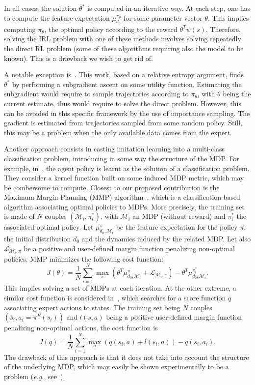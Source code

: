 \documentclass[tablecaption=bottom]{jmlr}
\begin{document}
In all cases, the solution $\theta^*$ is computed in an iterative
way. At each step, one has to compute the feature expectation
$\mu^{\pi_\theta}_{d_0}$ for some parameter vector $\theta$. This
implies computing $\pi_\theta$, the optimal policy according to the
reward $\theta^T\psi(s)$. Therefore, solving the IRL problem with
one of these methods involves solving repeatedly the direct RL
problem (some of these algorithms requiring also the model to be
known). This is a drawback we wish to get rid of.

A notable exception is~\cite{boularias2011relative}. This work,
based on a relative entropy argument, finds $\theta^*$ by performing
a subgradient ascent on some utility function. Estimating the
subgradient would require to sample trajectories according to
$\pi_\theta$, with $\theta$ being the current estimate, thus would
require to solve the direct problem. However, this can be avoided in
this specific framework by the use of importance sampling. The
gradient is estimated from trajectories sampled from some random
policy. Still, this may be a problem when the only available data
comes from the expert.

Another approach consists in casting imitation learning into a
multi-class classification problem, introducing in some way the
structure of the MDP. For example, in~\cite{melo2010learning}, the
agent policy is learnt as the solution of a classification problem.
They consider a kernel function built on some induced MDP metric,
which may be combersome to compute. Closest to our proposed
contribution is the Maximum Margin Planning (MMP)
algorithm~\cite{ratliff2006maximum}, which is a classification-based
algorithm associating optimal policies to MDPs. More precisely, the
training set is made of $N$ couples $(\mathcal{M}_i,\pi^*_i)$, with
$\mathcal{M}_i$ an MDP (without reward) and $\pi_i^*$ the associated
optimal policy. Let $\mu^\pi_{d_0,\mathcal{M}_i}$ be the feature
expectation for the policy $\pi$, the initial distribution $d_0$ and
the dynamics induced by the related MDP. Let also
$\mathcal{L}_{\mathcal{M}_i,\pi}$ be a positive and user-defined
margin function penalizing non-optimal policies. MMP minimizes the
following cost function:
\begin{equation}
  J(\theta) = \frac{1}{N}\sum_{i=1}^N \max_\pi(\theta^T
  \mu^\pi_{d_0,\mathcal{M}_i} + \mathcal{L}_{\mathcal{M}_i,\pi}) - \theta^T
  \mu^{\pi_i^*}_{d_0,\mathcal{M}_i}.\nonumber
\end{equation}
This implies solving a set of MDPs at each iteration. At the other
extreme, a similar cost function is considered
in~\cite{ratliff2007imitation}, which searches for a score function
$q$ associating expert actions to states. The training set being $N$
couples $(s_i,a_i=\pi^E(s_i))$ and $l(s,a)$ being a positive
user-defined margin function penalizing non-optimal actions, the
cost function is
\begin{equation}
  J(q) = \frac{1}{N}\sum_{i=1}^N \max_a (q(s_i,a) +
  l(s_i,a))-q(s_i,a_i).\nonumber
\end{equation}
The drawback of this approach is that it does not take into account
the structure of the underlying MDP, which may easily be shown
experimentally to be a problem (\textit{e.g.},
see~\cite{melo2010learning}).
\end{document}
